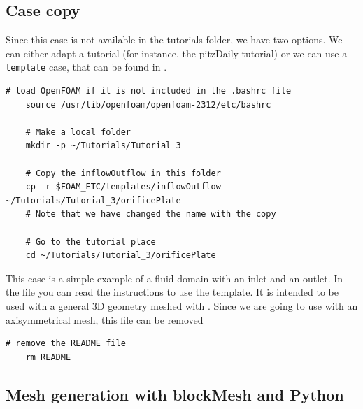 \documentclass[
    parskip=half,      %
    DIV=12,            %
    headings=normal,   %
    fontsize=11pt,     %
    english            %
]{scrartcl}
\begin{document}
\subsection{Case copy}

Since this case is not available in the tutorials folder, we have two options. We can
either adapt a tutorial (for instance, the pitzDaily tutorial) or we can use a 
\texttt{template} case, that can be found in . 

\begin{lstlisting}[style=terminal]
	# load OpenFOAM if it is not included in the .bashrc file
	source /usr/lib/openfoam/openfoam-2312/etc/bashrc
	
	# Make a local folder
	mkdir -p ~/Tutorials/Tutorial_3
	
	# Copy the inflowOutflow in this folder
	cp -r $FOAM_ETC/templates/inflowOutflow ~/Tutorials/Tutorial_3/orificePlate
	# Note that we have changed the name with the copy
	
	# Go to the tutorial place
	cd ~/Tutorials/Tutorial_3/orificePlate
\end{lstlisting}

This case is a simple example of a fluid domain with an inlet and an outlet. In the
 file you can read the instructions to use the template. It is intended
to be used with a general 3D geometry meshed with . Since
we are going to use  with an axisymmetrical mesh, this file 
can be removed

\begin{lstlisting}[style=terminal]
	# remove the README file
	rm README
\end{lstlisting}


\subsection{Mesh generation with blockMesh and Python}
\end{document}
